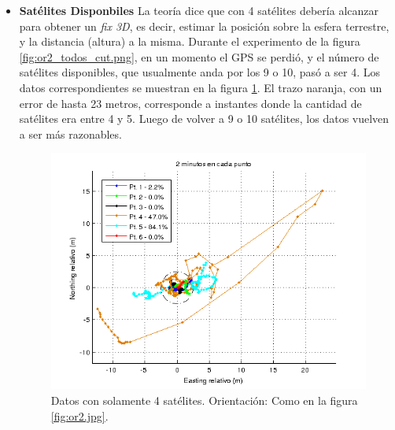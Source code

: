 \documentclass[spanish,12pt,a4paper,titlepage]{report}
\begin{document}
\begin{itemize}
\item \textbf{Satélites Disponbiles}
La teoría dice que con 4 satélites debería alcanzar para obtener un \textit{fix 3D}, es decir, estimar la posición sobre la esfera terrestre, y la distancia (altura) a la misma. Durante el experimento de la figura \ref{fig:or2_todos_cut.png}, en un momento el GPS se perdió, y el número de satélites disponibles, que usualmente anda por los 9 o 10, pasó a ser 4. Los datos correspondientes se muestran en la figura \ref{fig:or2_todos_sat_mal.png}. El trazo naranja, con un error de hasta 23 metros, corresponde a instantes donde la cantidad de satélites era entre 4 y 5. Luego de volver a 9 o 10 satélites, los datos vuelven a ser más razonables.

\begin{figure}[h!]
  \includegraphics[width=1\textwidth]{./img/or2_todos_sat_mal.png}
  \caption{Datos con solamente 4 satélites. Orientación: Como en la figura \ref{fig:or2.jpg}.}
  \label{fig:or2_todos_sat_mal.png}
\end{figure}


\end{itemize}
\end{document}
